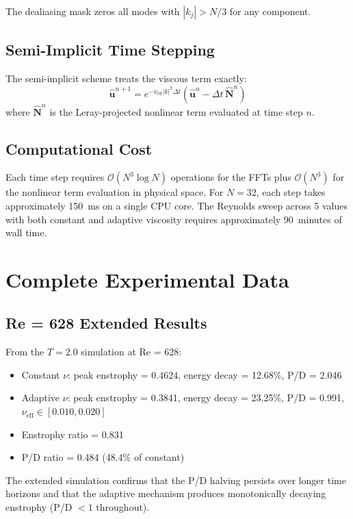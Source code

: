 \documentclass[12pt, a4paper]{article}
\begin{document}
The dealiasing mask zeros all modes with $|k_j| > N/3$ for any component.

\subsection{Semi-Implicit Time Stepping}

The semi-implicit scheme treats the viscous term exactly:
\begin{equation}
\hat{\mathbf{u}}^{n+1} = e^{-\nu_{\mathrm{eff}} |k|^2 \Delta t}
\left(\hat{\mathbf{u}}^n - \Delta t \, \hat{\mathbf{N}}^n \right)
\end{equation}
where $\hat{\mathbf{N}}^n$ is the Leray-projected nonlinear term
evaluated at time step $n$.

\subsection{Computational Cost}

Each time step requires $\mathcal{O}(N^3 \log N)$ operations
for the FFTs plus $\mathcal{O}(N^3)$ for the nonlinear term
evaluation in physical space. For $N = 32$, each step takes
approximately 150~ms on a single CPU core. The Reynolds sweep
across 5 values with both constant and adaptive viscosity
requires approximately 90~minutes of wall time.


\section{Complete Experimental Data}\label{app:data}

\subsection{Re = 628 Extended Results}

From the $T = 2.0$ simulation at Re = 628:

\begin{itemize}
\item Constant $\nu$: peak enstrophy = 0.4624,
  energy decay = 12.68\%, P/D = 2.046
\item Adaptive $\nu$: peak enstrophy = 0.3841,
  energy decay = 23.25\%, P/D = 0.991,
  $\nu_{\mathrm{eff}} \in [0.010, 0.020]$
\item Enstrophy ratio = 0.831
\item P/D ratio = 0.484 (48.4\% of constant)
\end{itemize}

The extended simulation confirms that the P/D halving persists
over longer time horizons and that the adaptive mechanism produces
monotonically decaying enstrophy (P/D $< 1$ throughout).
\end{document}
